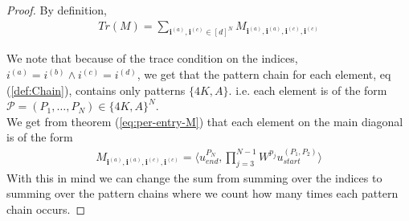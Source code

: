 \documentclass[12pt,a4paper]{article}
\begin{document}
\begin{proof}
By definition,
\begin{align}
{Tr}(M)
=\sum_{\boldsymbol{i}^{(a)},\boldsymbol{i}^{(c)}\in[d]^{N}}
M_{\boldsymbol{i}^{(a)},\boldsymbol{i}^{(a)},\boldsymbol{i}^{(c)},\boldsymbol{i}^{(c)}}\label{def:tr_sum}
\end{align}


We note that because of the trace condition on the indices, $i^{(a)}=i^{(b)}\land i^{(c)}=i^{(d)}$, we get that the pattern chain for each element, eq (\ref{def:Chain}),  contains only patterns $\{4K,A\}$. i.e. each element is of the form $\mathcal{P}=(P_{1},\ldots,P_{N})\in\{4K,A\}^{N}$.\\
We get from theorem (\ref{eq:per-entry-M}) that each element on the main diagonal is of the form
\begin{align}
M_{\boldsymbol{i}^{(a)},\boldsymbol{i}^{(a)},\boldsymbol{i}^{(c)},\boldsymbol{i}^{(c)}}=\langle u_{end}^{P_N},\prod_{j=3}^{N-1}W^{p_j}u_{start}^{(P_1,P_2)}\rangle
\end{align}
With this in mind we can change the sum from summing over the indices to summing over the pattern chains where we count how many times each pattern chain occurs.


\end{proof}
\end{document}
